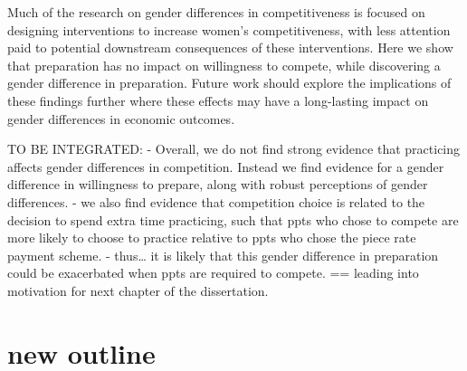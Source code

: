 \documentclass[a4paper, nobind]{templates/ociamthesis}
\begin{document}
Much of the research on gender differences in competitiveness is focused on designing interventions to increase women's competitiveness, with less attention paid to potential downstream consequences of these interventions. Here we show that preparation has no impact on willingness to compete, while discovering a gender difference in preparation. Future work should explore the implications of these findings further where these effects may have a long-lasting impact on gender differences in economic outcomes.

TO BE INTEGRATED:
- Overall, we do not find strong evidence that practicing affects gender differences in competition. Instead we find evidence for a gender difference in willingness to prepare, along with robust perceptions of gender differences.
- we also find evidence that competition choice is related to the decision to spend extra time practicing, such that ppts who chose to compete are more likely to choose to practice relative to ppts who chose the piece rate payment scheme.
- thus\ldots{} it is likely that this gender difference in preparation could be exacerbated when ppts are required to compete. == leading into motivation for next chapter of the dissertation.

\hypertarget{new-outline}{%
\section{new outline}\label{new-outline}}
\end{document}
